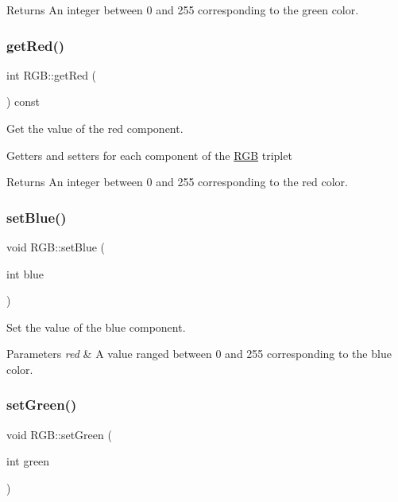 \begin{DoxyReturn}{Returns}
An integer between 0 and 255 corresponding to the green color. 
\end{DoxyReturn}
\mbox{\label{class_r_g_b_a5460bb83c10f775623b9ad2c9d35be6e}} 
\subsubsection{\texorpdfstring{get\+Red()}{getRed()}}
{\footnotesize\ttfamily int R\+G\+B\+::get\+Red (\begin{DoxyParamCaption}{ }\end{DoxyParamCaption}) const}



Get the value of the red component. 

Getters and setters for each component of the \mbox{\hyperlink{class_r_g_b}{R\+GB}} triplet

\begin{DoxyReturn}{Returns}
An integer between 0 and 255 corresponding to the red color. 
\end{DoxyReturn}
\mbox{\label{class_r_g_b_a573173b96ccd76621058d224e7745f6d}} 
\subsubsection{\texorpdfstring{set\+Blue()}{setBlue()}}
{\footnotesize\ttfamily void R\+G\+B\+::set\+Blue (\begin{DoxyParamCaption}\item[{int}]{blue }\end{DoxyParamCaption})}



Set the value of the blue component. 


\begin{DoxyParams}{Parameters}
{\em red} & A value ranged between 0 and 255 corresponding to the blue color. \\
\hline
\end{DoxyParams}
\mbox{\label{class_r_g_b_a7d576326cbb9e02ebbb7aec901858cf7}} 
\subsubsection{\texorpdfstring{set\+Green()}{setGreen()}}
{\footnotesize\ttfamily void R\+G\+B\+::set\+Green (\begin{DoxyParamCaption}\item[{int}]{green }\end{DoxyParamCaption})}



